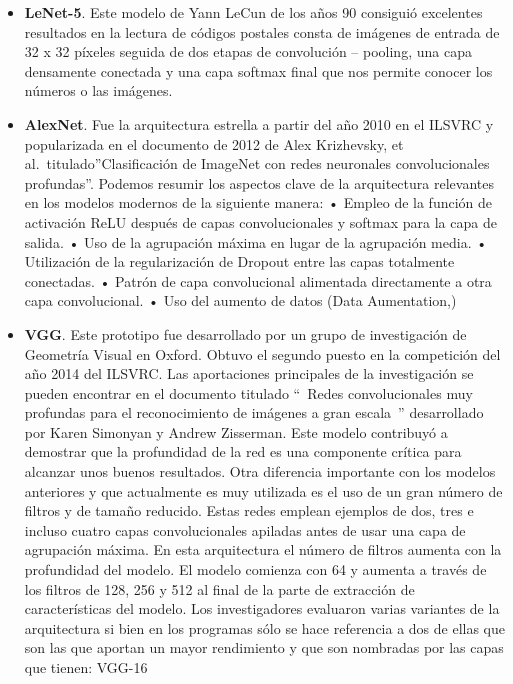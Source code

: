 \documentclass[
  a4paper,
  DIV=11,
  numbers=noendperiod]{scrreprt}
\begin{document}
\begin{itemize}
\item
  \textbf{LeNet-5}. Este modelo de Yann LeCun de los años 90 consiguió
  excelentes resultados en la lectura de códigos postales consta de
  imágenes de entrada de 32 x 32 píxeles seguida de dos etapas de
  convolución -- pooling, una capa densamente conectada y una capa
  softmax final que nos permite conocer los números o las imágenes.
\item
  \textbf{AlexNet}. Fue la arquitectura estrella a partir del año 2010
  en el ILSVRC y popularizada en el documento de 2012 de Alex
  Krizhevsky, et al.~titulado''Clasificación de ImageNet con redes
  neuronales convolucionales profundas''. Podemos resumir los aspectos
  clave de la arquitectura relevantes en los modelos modernos de la
  siguiente manera: • Empleo de la función de activación ReLU después de
  capas convolucionales y softmax para la capa de salida. • Uso de la
  agrupación máxima en lugar de la agrupación media. • Utilización de la
  regularización de Dropout entre las capas totalmente conectadas. •
  Patrón de capa convolucional alimentada directamente a otra capa
  convolucional. • Uso del aumento de datos (Data Aumentation,)
\item
  \textbf{VGG}. Este prototipo fue desarrollado por un grupo de
  investigación de Geometría Visual en Oxford. Obtuvo el segundo puesto
  en la competición del año 2014 del ILSVRC. Las aportaciones
  principales de la investigación se pueden encontrar en el documento
  titulado ``~Redes convolucionales muy profundas para el reconocimiento
  de imágenes a gran escala~'' desarrollado por Karen Simonyan y Andrew
  Zisserman. Este modelo contribuyó a demostrar que la profundidad de la
  red es una componente crítica para alcanzar unos buenos resultados.
  Otra diferencia importante con los modelos anteriores y que
  actualmente es muy utilizada es el uso de un gran número de filtros y
  de tamaño reducido. Estas redes emplean ejemplos de dos, tres e
  incluso cuatro capas convolucionales apiladas antes de usar una capa
  de agrupación máxima. En esta arquitectura el número de filtros
  aumenta con la profundidad del modelo. El modelo comienza con 64 y
  aumenta a través de los filtros de 128, 256 y 512 al final de la parte
  de extracción de características del modelo. Los investigadores
  evaluaron varias variantes de la arquitectura si bien en los programas
  sólo se hace referencia a dos de ellas que son las que aportan un
  mayor rendimiento y que son nombradas por las capas que tienen: VGG-16

\end{itemize}
\end{document}

